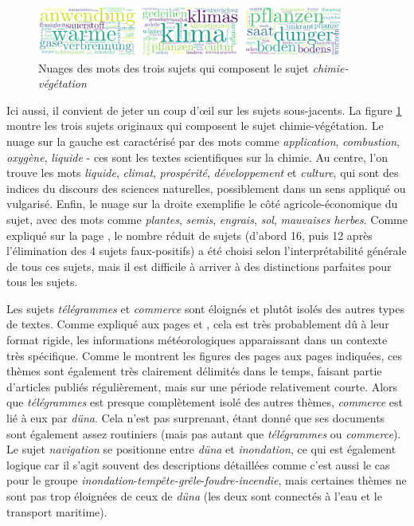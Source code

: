 \documentclass[a4paper,twoside,12pt]{article}
\begin{document}
\begin{figure}[h]
    \centering
    \includegraphics[width=0.9\textwidth]{images/subtopics_wordcloud_1.pdf}
    \caption{Nuages des mots des trois sujets qui composent le sujet \textit{chimie-végétation}}
    \label{fig:suptopic_worcloud_1}
\end{figure}

Ici aussi, il convient de jeter un coup d'œil sur les sujets sous-jacents. La figure \ref{fig:suptopic_worcloud_1} montre les trois sujets originaux qui composent le sujet chimie-végétation. Le nuage sur la gauche est caractérisé par des mots comme \textit{application}, \textit{combustion}, \textit{oxygène}, \textit{liquide} - ces sont les textes scientifiques sur la chimie. Au centre, l'on trouve les mots \textit{liquide}, \textit{climat}, \textit{prospérité}, \textit{développement} et \textit{culture}, qui sont des indices du discours des sciences naturelles, possiblement dans un sens appliqué ou vulgarisé. Enfin, le nuage sur la droite exemplifie le côté agricole-économique du sujet, avec des mots comme \textit{plantes}, \textit{semis}, \textit{engrais}, \textit{sol}, \textit{mauvaises herbes}. Comme expliqué sur la page \pageref{46_topics}, le nombre réduit de sujets (d'abord 16, puis 12 après l'élimination des 4 sujets faux-positifs) a été choisi selon l'interprétabilité générale de tous ces sujets, mais il est difficile à arriver à des distinctions parfaites pour tous les sujets.

Les sujets \textit{télégrammes} et \textit{commerce} sont éloignés et plutôt isolés des autres types de textes. Comme expliqué aux pages \pageref{topic10_télégrammes} et \pageref{topic4_commerce}, cela est très probablement dû à leur format rigide, les informations météorologiques apparaissant dans un contexte très spécifique. Comme le montrent les figures des pages aux pages indiquées, ces thèmes sont également très clairement délimités dans le temps, faisant partie d'articles publiés régulièrement, mais sur une période relativement courte. Alors que \textit{télégrammes} est presque complètement isolé des autres thèmes, \textit{commerce} est lié à eux par \textit{düna}. Cela n'est pas surprenant, étant donné que ses documents sont également assez routiniers (mais pas autant que \textit{télégrammes} ou \textit{commerce}). Le sujet \textit{navigation} se positionne entre \textit{düna} et \textit{inondation}, ce qui est également logique car il s'agit souvent des descriptions détaillées comme c'est aussi le cas pour le groupe \textit{inondation}-\textit{tempête-grêle}-\textit{foudre-incendie}, mais certaines thèmes ne sont pas trop éloignées de ceux de \textit{düna} (les deux sont connectés à l'eau et le transport maritime).
\end{document}
